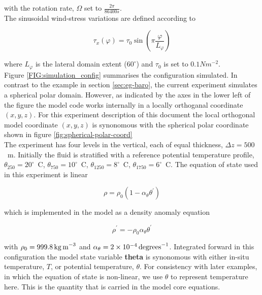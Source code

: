 \noindent with the rotation rate, $\Omega$ set to $\frac{2 \pi}{86400s}$.
\\
  
 The sinusoidal wind-stress variations are defined according to 

\begin{equation}
\label{EQ:taux}
\tau_x(\varphi) = \tau_{0}\sin(\pi \frac{\varphi}{L_{\varphi}})
\end{equation}
 
\noindent where $L_{\varphi}$ is the lateral domain extent ($60^{\circ}$) and 
$\tau_0$ is set to $0.1N m^{-2}$. 
\\

Figure \ref{FIG:simulation_config}
summarises the configuration simulated.
In contrast to the example in section \ref{sec:eg-baro}, the 
current experiment simulates a spherical polar domain. However, as indicated
by the axes in the lower left of the figure the model code works internally
in a locally orthoganal coordinate $(x,y,z)$. For this experiment description 
of this document the local orthogonal model coordinate $(x,y,z)$ is synonomous 
with the spherical polar coordinate shown in figure 
\ref{fig:spherical-polar-coord}
\\

The experiment has four levels in the vertical, each of equal thickness,
$\Delta z = 500$~m. Initially the fluid is stratified with a reference
potential temperature profile,
$\theta_{250}=20^{\circ}$~C,
$\theta_{750}=10^{\circ}$~C,
$\theta_{1250}=8^{\circ}$~C,
$\theta_{1750}=6^{\circ}$~C. The equation of state used in this experiment is 
linear

\begin{equation}
\label{EQ:linear1_eos}
\rho = \rho_{0} ( 1 - \alpha_{\theta}\theta^{'} )
\end{equation}

\noindent which is implemented in the model as a density anomaly equation

\begin{equation}
\label{EQ:linear1_eos_pert}
\rho^{'} = -\rho_{0}\alpha_{\theta}\theta^{'}
\end{equation}

\noindent with $\rho_{0}=999.8\,{\rm kg\,m}^{-3}$ and 
$\alpha_{\theta}=2\times10^{-4}\,{\rm degrees}^{-1} $. Integrated forward in
this configuration the model state variable {\bf theta} is synonomous with
either in-situ temperature, $T$, or potential temperature, $\theta$. For 
consistency with later examples, in which the equation of state is
non-linear, we use $\theta$ to represent temperature here. This is
the quantity that is carried in the model core equations.

